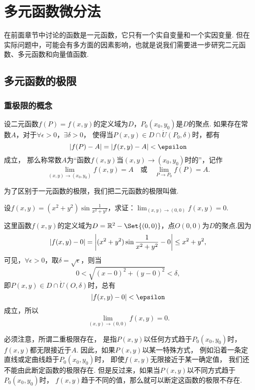\chapter{多元函数微分法}
在前面章节中讨论的函数是一元函数，它只有一个实自变量和一个实因变量.
但在实际问题中，可能会有多方面的因素影响，也就是说我们需要进一步研究二元函数、多元函数和向量值函数.

\section{多元函数的极限}
\subsection{重极限的概念}
\begin{definition}
设二元函数\(f(P)=f(x,y)\)的定义域为\(D\)，\(P_0(x_0,y_0)\)是\(D\)的聚点.
如果存在常数\(A\)，对于\(\forall \epsilon > 0\)，\(\exists \delta > 0\)，
使得当\(P(x,y) \in D \cap \mathring{U}(P_0,\delta)\)时，都有\[
	\abs{f(P)-A} = \abs{f(x,y)-A} < \epsilon
\]成立，
那么称常数\(A\)为“函数\(f(x,y)\)当\((x,y)\to(x_0,y_0)\)时的”，记作\[
	\lim_{(x,y)\to(x_0,y_0)} f(x,y) = A
	\quad\text{或}\quad
	\lim_{P \to P_0} f(P) = A.
\]

为了区别于一元函数的极限，我们把二元函数的极限叫做.
\end{definition}

\begin{example}
设\(f(x,y) = (x^2+y^2) \sin\frac{1}{x^2+y^2}\)，求证：\(\lim_{(x,y)\to(0,0)} f(x,y) = 0\).
\begin{solution}
这里函数\(f(x,y)\)的定义域为\(D = \mathbb{R}^2 - \Set{(0,0)}\)，点\(O(0,0)\)为\(D\)的聚点.因为\[
\abs{f(x,y)-0}
= \abs{(x^2+y^2) \sin\frac{1}{x^2+y^2} - 0}
\leq x^2+y^2,
\]可见，\(\forall\epsilon>0\)，取\(\delta=\sqrt{\epsilon}\)，则当\[
0 < \sqrt{(x-0)^2+(y-0)^2} < \delta,
\]即\(P(x,y) \in D \cap \mathring{U}(O,\delta)\)时，总有\[
\abs{f(x,y)-0} < \epsilon
\]成立，所以\[
\lim_{(x,y)\to(0,0)} f(x,y) = 0.
\]
\end{solution}
\end{example}

必须注意，所谓二重极限存在，
是指\(P(x,y)\)以任何方式趋于\(P_0(x_0,y_0)\)时，\(f(x,y)\)都无限接近于\(A\).
因此，如果\(P(x,y)\)以某一特殊方式，
例如沿着一条定直线或定曲线趋于\(P_0(x_0,y_0)\)时，
即使\(f(x,y)\)无限接近于某一确定值，
我们还不能由此断定函数的极限存在.
但是反过来，如果当\(P(x,y)\)以不同方式趋于\(P_0(x_0,y_0)\)时，
\(f(x,y)\)趋于不同的值，那么就可以断定这函数的极限不存在.

